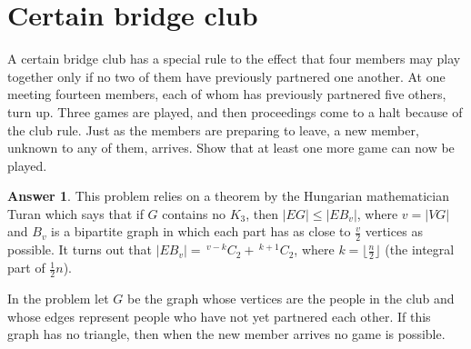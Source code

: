 \documentclass[a4paper]{article}
\renewcommand{\(}{\left(}
\renewcommand{\)}{\right)}
\theoremstyle{plain}
\theoremstyle{plain}
\theoremstyle{definition}
\newtheorem*{answer}{Answer}
\begin{document}
\section{Certain bridge club}
A certain bridge club has a special rule to the effect that four members may play together only if no two of them have previously partnered one another. At one meeting fourteen members, each of whom has previously partnered five others, turn up. Three games are played, and then proceedings come to a halt because of the club rule. Just as the members are preparing to leave, a new member, unknown to any of them, arrives. Show that at least one more game can now be played.
\begin{shaded}
\begin{answer}
This problem relies on a theorem by the Hungarian mathematician Turan which says that if $G$ contains no $K_3$,  then $|EG| \leq |EB_v|$, where $v = |VG|$  and $B_v$ is a bipartite graph in which each part has as close to $\frac{v}{2}$ vertices as possible. It turns out that  $ |EB_v| = \, ^{v-k} \!  C_2 + \, ^{k+1} \!  C_2 $, where $ k = \lfloor \frac{n}{2} \rfloor $  (the integral part of $ \frac{1}{2} n $).

In the problem let $G$ be the graph whose vertices are the people in the club and whose edges represent people who have not yet partnered each other. If this graph has no triangle, then when the new member arrives no game is possible.

\end{answer}
\end{shaded}
\end{document}
